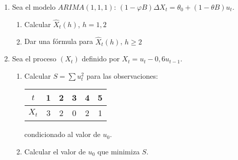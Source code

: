 \begin{enumerate}
\item Sea el modelo $ARIMA ( 1, 1, 1)$: $(1-\varphi B) \Delta  X_{t}=\theta_{0} +(1-\theta B) u_{t}$.
\begin{enumerate}
 \item Calcular $\widehat{X}_{t} (h)$, $h= 1, 2$
\item Dar una f\'{o}rmula para $\widehat{X}_{t} (h)$, $h \ge 2$
\end{enumerate}

\item Sea el proceso $(X_{t})$ definido por $X_{t} =u_{t} -0,6u_{t-1} $.
\begin{enumerate}
 \item Calcular $S=\sum {u_{t}^{2} }$ para las observaciones:
 \begin{center}
\begin{tabular}{@{}cccccc@{}}
\toprule
$t$& 1& 2& 3& 4& 5 \\
\midrule
$X_{t}$& 3& 2& 0& 2& 1 \\
\bottomrule
\end{tabular}
\end{center}
condicionado al valor de $u_{0}$.

\item Calcular el valor de $u_{0}$ que minimiza $S$.
\end{enumerate}



\end{enumerate}

